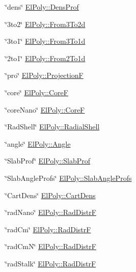 \begin{DoxyItemize}
\item \char`\"{}dens\char`\"{} \hyperlink{classElPoly_a70302b7bbfa248d2963323bc63a4a292}{El\+Poly\+::\+Dens\+Prof} 
\item \char`\"{}3to2\char`\"{} \hyperlink{classElPoly_a4e71c4abd7c3ed37f29a8fcae064fd32}{El\+Poly\+::\+From3\+To2d} 
\item \char`\"{}3to1\char`\"{} \hyperlink{classElPoly_a0b9109dcecbeec17c94472b5e638580a}{El\+Poly\+::\+From3\+To1d} 
\item \char`\"{}2to1\char`\"{} \hyperlink{classElPoly_a30e6658740047a2fdd996e2b843e91b9}{El\+Poly\+::\+From2\+To1d} 
\item \char`\"{}pro\char`\"{} \hyperlink{classElPoly_aa2dbcd635807df0929968ec8932631ab}{El\+Poly\+::\+ProjectionF} 
\item \char`\"{}core\char`\"{} \hyperlink{classElPoly_a04dd79cb2f5e46ae301b6dc1d57db28a}{El\+Poly\+::\+CoreF} 
\item \char`\"{}core\+Nano\char`\"{} \hyperlink{classElPoly_a04dd79cb2f5e46ae301b6dc1d57db28a}{El\+Poly\+::\+CoreF} 
\item \char`\"{}\+Rad\+Shell\char`\"{} \hyperlink{classElPoly_a64e019ffaa4437477ea433f7b5113341}{El\+Poly\+::\+Radial\+Shell} 
\item \char`\"{}angle\char`\"{} \hyperlink{classElPoly_ae3aab8086f988eecdd12b8f29f45a56a}{El\+Poly\+::\+Angle} 
\item \char`\"{}\+Slab\+Prof\char`\"{} \hyperlink{classElPoly_a3db31f8490f0ea101281679a270e72fe}{El\+Poly\+::\+Slab\+Prof} 
\item \char`\"{}\+Slab\+Angle\+Profs\char`\"{} \hyperlink{classElPoly_a4192d526e79a4c1e0b4910a4f35720c4}{El\+Poly\+::\+Slab\+Angle\+Profs} 
\item \char`\"{}\+Cart\+Dens\char`\"{} \hyperlink{classElPoly_ac946a8b29f4eec0816699ce0c0cac23c}{El\+Poly\+::\+Cart\+Dens} 
\item \char`\"{}rad\+Nano\char`\"{} \hyperlink{classElPoly_aff852b942203d47f2e21e2616537cbdd}{El\+Poly\+::\+Rad\+DistrF} 
\item \char`\"{}rad\+Cm\char`\"{} \hyperlink{classElPoly_aff852b942203d47f2e21e2616537cbdd}{El\+Poly\+::\+Rad\+DistrF} 
\item \char`\"{}rad\+Cm\+N\char`\"{} \hyperlink{classElPoly_aff852b942203d47f2e21e2616537cbdd}{El\+Poly\+::\+Rad\+DistrF} 
\item \char`\"{}rad\+Stalk\char`\"{} \hyperlink{classElPoly_aff852b942203d47f2e21e2616537cbdd}{El\+Poly\+::\+Rad\+DistrF} 

\end{DoxyItemize}
